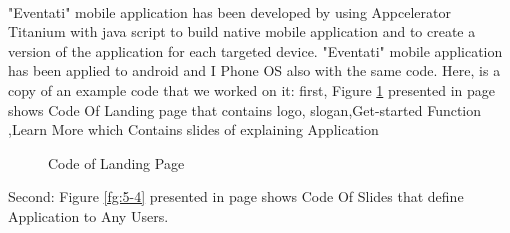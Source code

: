\documentclass[12pt,a4paper,class,twoside,openany]{report}
\begin{document}
{ \paragraph*{\hspace{.9 cm} } "Eventati" mobile application has been developed by using Appcelerator Titanium with java script to build native mobile application and to create a version of the application for each targeted device. "Eventati" mobile application has been applied to android and I Phone OS also with the same code. 
Here, is a copy of an example code that we worked on it:
first,
Figure \ref{fg:5-3} presented in page \pageref{fg:5-3}shows Code Of Landing page that contains logo, slogan,Get-started Function ,Learn More which Contains slides of explaining Application
\begin{figure}
\begin{center}
\caption{Code of Landing Page}
\label{fg:5-3}
\end{center}
\end{figure}
Second:
Figure \ref{fg:5-4} presented in page \pageref{fg:5-4}shows Code Of Slides that define Application to Any Users.
\begin{figure}
\begin{center}
\fbox{
}
\end{center}
\end{figure}}
\end{document}
